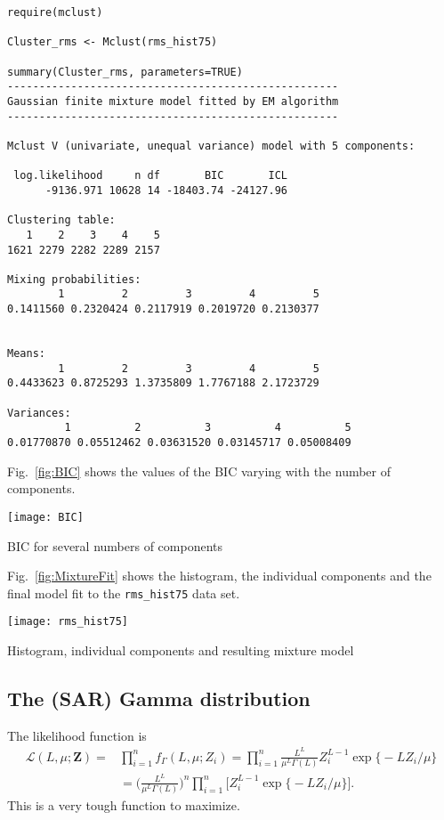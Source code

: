 \begin{lstlisting}[frame=lines]
require(mclust)

Cluster_rms <- Mclust(rms_hist75)

summary(Cluster_rms, parameters=TRUE)
----------------------------------------------------
Gaussian finite mixture model fitted by EM algorithm 
----------------------------------------------------

Mclust V (univariate, unequal variance) model with 5 components:

 log.likelihood     n df       BIC       ICL
      -9136.971 10628 14 -18403.74 -24127.96

Clustering table:
   1    2    3    4    5 
1621 2279 2282 2289 2157 

Mixing probabilities:
        1         2         3         4         5 
0.1411560 0.2320424 0.2117919 0.2019720 0.2130377 


Means:
        1         2         3         4         5 
0.4433623 0.8725293 1.3735809 1.7767188 2.1723729 

Variances:
         1          2          3          4          5 
0.01770870 0.05512462 0.03631520 0.03145717 0.05008409 
\end{lstlisting}

Fig.~\ref{fig:BIC} shows the values of the BIC varying with the number of components.

\begin{marginfigure}
\centering
\texttt{[image: BIC]}
\caption{BIC for several numbers of components}
\label{fig:BIC}
\end{marginfigure}

Fig.~\ref{fig:MixtureFit} shows the histogram, the individual components and the final model fit to the \verb|rms_hist75| data set.

\begin{marginfigure}
\centering
\texttt{[image: rms\_hist75]}
\caption{Histogram, individual components and resulting mixture model}
\label{fig:MixtureFit}
\end{marginfigure}


\subsection{The (SAR) Gamma distribution}

The likelihood function is 
\begin{align}
\mathcal L(L,\mu;\bm Z) =& \prod_{i=1}^{n}f_\Gamma(L,\mu; Z_i) = \prod_{i=1}^{n}\frac{L^L}{\mu^{L}\Gamma(L)} Z_i^{L-1} 
	\exp\big\{ -L Z_i / \mu
	\big\} \nonumber\\
	& = 
	\bigg(
	\frac{L^L}{\mu^{L}\Gamma(L)}
	\bigg)^n \prod_{i=1}^{n} \Big[Z_i^{L-1} \exp\big\{ -L Z_i / \mu
		\big\} \Big].
\end{align}
This is a very tough function to maximize.

